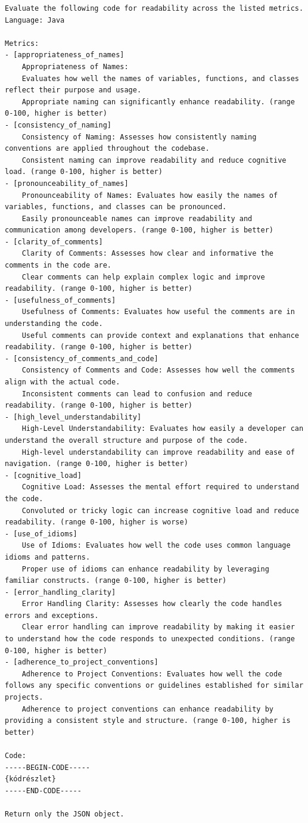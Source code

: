 \documentclass[
]{elteikthesis}[2024/04/26]
\begin{document}
\begin{lstlisting}[breaklines=true]
Evaluate the following code for readability across the listed metrics.
Language: Java

Metrics:
- [appropriateness_of_names]
	Appropriateness of Names:
	Evaluates how well the names of variables, functions, and classes reflect their purpose and usage.
	Appropriate naming can significantly enhance readability. (range 0-100, higher is better)
- [consistency_of_naming]
	Consistency of Naming: Assesses how consistently naming conventions are applied throughout the codebase.
	Consistent naming can improve readability and reduce cognitive load. (range 0-100, higher is better)
- [pronounceability_of_names]
	Pronounceability of Names: Evaluates how easily the names of variables, functions, and classes can be pronounced.
	Easily pronounceable names can improve readability and communication among developers. (range 0-100, higher is better)
- [clarity_of_comments]
	Clarity of Comments: Assesses how clear and informative the comments in the code are.
	Clear comments can help explain complex logic and improve readability. (range 0-100, higher is better)
- [usefulness_of_comments]
	Usefulness of Comments: Evaluates how useful the comments are in understanding the code.
	Useful comments can provide context and explanations that enhance readability. (range 0-100, higher is better)
- [consistency_of_comments_and_code]
	Consistency of Comments and Code: Assesses how well the comments align with the actual code.
	Inconsistent comments can lead to confusion and reduce readability. (range 0-100, higher is better)
- [high_level_understandability]
	High-Level Understandability: Evaluates how easily a developer can understand the overall structure and purpose of the code.
	High-level understandability can improve readability and ease of navigation. (range 0-100, higher is better)
- [cognitive_load]
	Cognitive Load: Assesses the mental effort required to understand the code.
	Convoluted or tricky logic can increase cognitive load and reduce readability. (range 0-100, higher is worse)
- [use_of_idioms]
	Use of Idioms: Evaluates how well the code uses common language idioms and patterns.
	Proper use of idioms can enhance readability by leveraging familiar constructs. (range 0-100, higher is better)
- [error_handling_clarity]
	Error Handling Clarity: Assesses how clearly the code handles errors and exceptions.
	Clear error handling can improve readability by making it easier to understand how the code responds to unexpected conditions. (range 0-100, higher is better)
- [adherence_to_project_conventions]
	Adherence to Project Conventions: Evaluates how well the code follows any specific conventions or guidelines established for similar projects.
	Adherence to project conventions can enhance readability by providing a consistent style and structure. (range 0-100, higher is better)

Code:
-----BEGIN-CODE-----
{kódrészlet}
-----END-CODE-----

Return only the JSON object.
\end{lstlisting}
\end{document}
